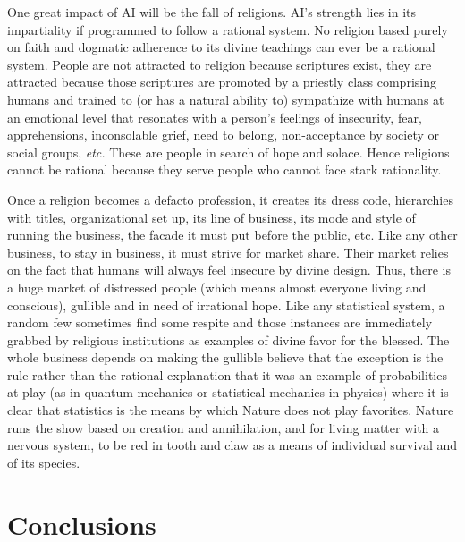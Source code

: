 \begin{multicols}{2}
One great impact of AI will be the fall of religions. AI's strength lies in its impartiality if programmed to follow a rational system. No religion based purely on faith and dogmatic adherence to its divine teachings can ever be a rational system. People are not attracted to religion because scriptures exist, they are attracted because those scriptures are promoted by a priestly class comprising humans and trained to (or has a natural ability to) sympathize with humans at an emotional level that resonates with a person's feelings of insecurity, fear, apprehensions, inconsolable grief, need to belong, non-acceptance by society or social groups, \textit{etc.} These are people in search of hope and solace. Hence religions cannot be rational because they serve people who cannot face stark rationality.

Once a religion becomes a defacto profession, it creates its dress code, hierarchies with titles, organizational set up, its line of business, its mode and style of running the business, the facade it must put before the public, etc. Like any other business, to stay in business, it must strive for market share. Their market relies on the fact that humans will always feel insecure by divine design. Thus, there is a huge market of distressed people (which means almost everyone living and conscious), gullible and in need of irrational hope. Like any statistical system, a random few sometimes find some respite and those instances are immediately grabbed by religious institutions as examples of divine favor for the blessed. The whole business depends on making the gullible believe that the exception is the rule rather than the rational explanation that it was an example of probabilities at play (as in quantum mechanics or statistical mechanics in physics) where it is clear that statistics is the means by which Nature does not play favorites. Nature runs the show based on creation and annihilation, and for living matter with a nervous system, to be red in tooth and claw as a means of individual survival and of its species.\\[-20pt]

\section{Conclusions}

\vskip -3pt


\end{multicols}
